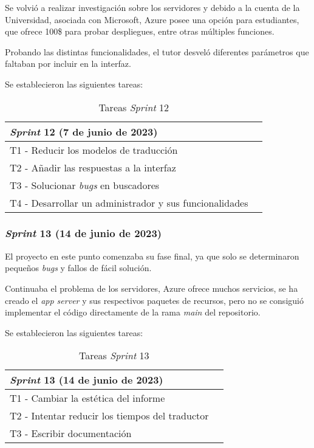 Se volvió a realizar investigación sobre los servidores y debido a la cuenta de la Universidad, asociada con Microsoft, Azure posee una opción para estudiantes, que ofrece 100\$ para probar despliegues, entre otras múltiples funciones.

Probando las distintas funcionalidades, el tutor desveló diferentes parámetros que faltaban por incluir en la interfaz.

Se establecieron las siguientes tareas:
\begin{table}[H]
\centering
\begin{tabular}{ll}
\toprule
\textit{Sprint} 12 (7 de junio de 2023)   \\
\midrule
T1 - Reducir los modelos de traducción\\
T2 - Añadir las respuestas a la interfaz\\
T3 - Solucionar \textit{bugs} en buscadores\\
T4 - Desarrollar un administrador y sus funcionalidades\\
\bottomrule
\end{tabular}
\caption{Tareas \textit{Sprint} 12}
\end{table}

\subsubsection{\textit{Sprint} 13 (14 de junio de 2023)}
El proyecto en este punto comenzaba su fase final, ya que solo se determinaron pequeños \textit{bugs} y fallos de fácil solución.

Continuaba el problema de los servidores, Azure ofrece muchos servicios, se ha creado el \textit{app server} y sus respectivos paquetes de recursos, pero no se consiguió implementar el código directamente de la rama \textit{main} del repositorio.

Se establecieron las siguientes tareas:
\begin{table}[H]
\centering
\begin{tabular}{ll}
\toprule
\textit{Sprint} 13 (14 de junio de 2023)   \\
\midrule
T1 - Cambiar la estética del informe\\
T2 - Intentar reducir los tiempos del traductor\\
T3 - Escribir documentación\\
\bottomrule
\end{tabular}
\caption{Tareas \textit{Sprint} 13}
\end{table}

